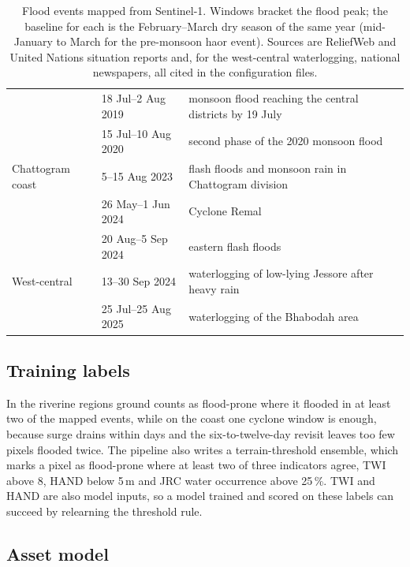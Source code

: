 \documentclass[10pt,a4paper,twocolumn]{article}
\begin{document}
\begin{table}[tp]
\begin{tabularx}{\textwidth}{llX}
 & 18 Jul--2 Aug 2019 & monsoon flood reaching the central districts by 19 July \\
 & 15 Jul--10 Aug 2020 & second phase of the 2020 monsoon flood \\
Chattogram coast & 5--15 Aug 2023 & flash floods and monsoon rain in Chattogram division \\
 & 26 May--1 Jun 2024 & Cyclone Remal \\
 & 20 Aug--5 Sep 2024 & eastern flash floods \\
West-central & 13--30 Sep 2024 & waterlogging of low-lying Jessore after heavy rain \\
 & 25 Jul--25 Aug 2025 & waterlogging of the Bhabodah area \\
\bottomrule
\end{tabularx}
\caption{Flood events mapped from Sentinel-1. Windows bracket the flood peak; the baseline for each is the February--March dry season of the same year (mid-January to March for the pre-monsoon haor event). Sources are ReliefWeb and United Nations situation reports and, for the west-central waterlogging, national newspapers, all cited in the configuration files.}
\label{tab:events}
\end{table}

\subsection{Training labels}
\label{sec:labels}

In the riverine regions ground counts as flood-prone where it flooded in at least two of the mapped events, while on the coast one cyclone window is enough, because surge drains within days and the six-to-twelve-day revisit leaves too few pixels flooded twice. The pipeline also writes a terrain-threshold ensemble, which marks a pixel as flood-prone where at least two of three indicators agree, TWI above 8, HAND below 5\,m and JRC water occurrence above 25\,\%. TWI and HAND are also model inputs, so a model trained and scored on these labels can succeed by relearning the threshold rule.

\subsection{Asset model}
\label{sec:gnn}
\end{document}
